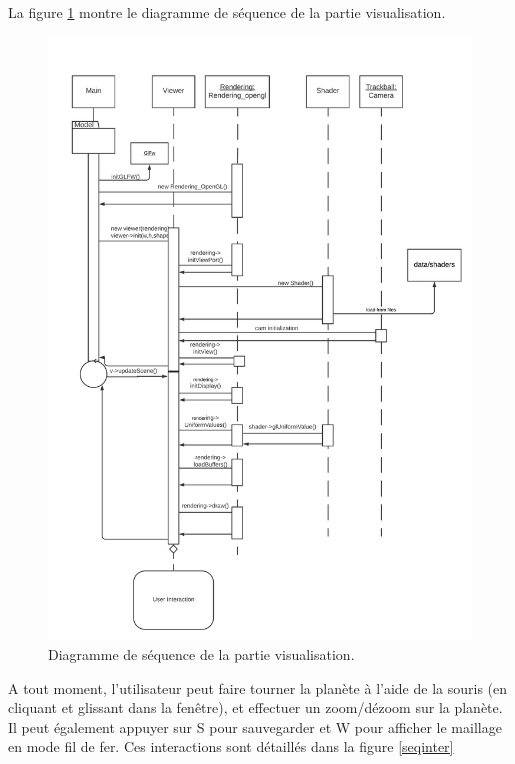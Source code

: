 \documentclass[a4paper]{article}
\begin{document}

La figure \ref{seqvisu} montre le diagramme de séquence de la partie visualisation.

\begin{figure}[!ht]
    \begin{center}
        \includegraphics[width=0.7\linewidth]{img/visu_seq.png} 
        \caption{Diagramme de séquence de la partie visualisation.}
        \label{seqvisu}
    \end{center}
\end{figure}

\newpage
A tout moment, l'utilisateur peut faire tourner la planète à l'aide de la souris (en cliquant et glissant dans la fenêtre), et effectuer un zoom/dézoom sur la planète. Il peut également appuyer sur S pour sauvegarder et W pour afficher le maillage en mode fil de fer. Ces interactions sont détaillés dans la figure \ref{seqinter} 
\end{document}
